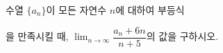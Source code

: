 수열 $\{a_n\}$이 모든 자연수 $n$에 대하여 부등식 \par\smallskip{}\par\smallskip\noindent 을 만족시킬 때, $\displaystyle\lim_{n\to\infty}\dfrac{a_n+6n}{n+5}$의 값을 구하시오.
